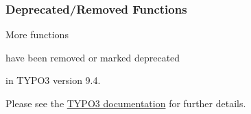 \begin{frame}[fragile]
	\frametitle{Deprecated/Removed Functions}

	\vspace{0.6cm}
	\begin{center}
		More functions
	\end{center}
	\vspace{-0.8cm}
	\begin{center}
		have been removed or marked deprecated
	\end{center}
	\vspace{-0.8cm}
	\begin{center}
		in TYPO3 version 9.4.
	\end{center}
	\vspace{-0.6cm}
	\begin{center}
		Please see the \href{https://docs.typo3.org/typo3cms/extensions/core/latest/Changelog/9.4/Index.html#deprecation}{TYPO3 documentation} for further details.
	\end{center}

\end{frame}

